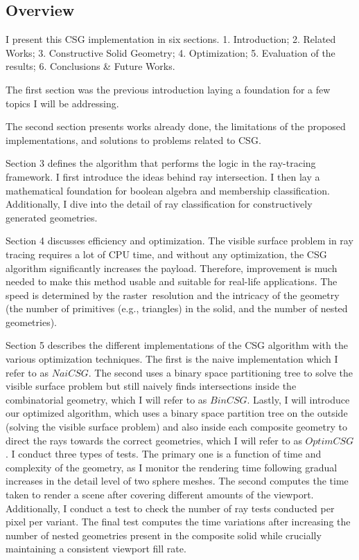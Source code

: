 \documentclass[a4paper,11pt,oneside]{article}
\begin{document}
\subsection{Overview}
  
I present this CSG implementation in six sections. 1. Introduction;  2. Related Works; 3. Constructive Solid Geometry; 4. Optimization; 5. Evaluation of the results; 6. Conclusions \& Future Works.

The first section was the previous introduction laying a foundation for a few topics I will be addressing. 
  
The second section presents works already done, the limitations of the proposed implementations, and solutions to problems related to CSG.
  
Section 3 defines the algorithm that performs the logic in the ray-tracing framework. I first introduce the ideas behind ray intersection. I then lay a mathematical foundation for boolean algebra and membership classification. Additionally, I dive into the detail of ray classification for constructively generated geometries. 
  
Section 4 discusses efficiency and optimization. The visible surface problem in ray tracing requires a lot of CPU time, and without any optimization, the CSG algorithm significantly increases the payload. Therefore, improvement is much needed to make this method usable and suitable for real-life applications. The speed is determined by the raster resolution and the intricacy of the geometry (the number of primitives (e.g., triangles) in the solid, and the number of nested geometries).
  
Section 5 describes the different implementations of the CSG algorithm with the various optimization techniques. The first is the naive implementation which I refer to as $NaiCSG$. The second uses a binary space partitioning tree to solve the visible surface problem but still naively finds intersections inside the combinatorial geometry, which I will refer to as $BinCSG$. Lastly, I will introduce our optimized algorithm, which uses a binary space partition tree on the outside (solving the visible surface problem) and also inside each composite geometry to direct the rays towards the correct geometries, which I will refer to as $OptimCSG$. I conduct three types of tests. The primary one is a function of time and complexity of the geometry, as I monitor the rendering time following gradual increases in the detail level of two sphere meshes. The second computes the time taken to render a scene after covering different amounts of the viewport. Additionally, I conduct a test to check the number of ray tests conducted per pixel per variant. The final test computes the time variations after increasing the number of nested geometries present in the composite solid while crucially maintaining a consistent viewport fill rate.
  
\end{document}
